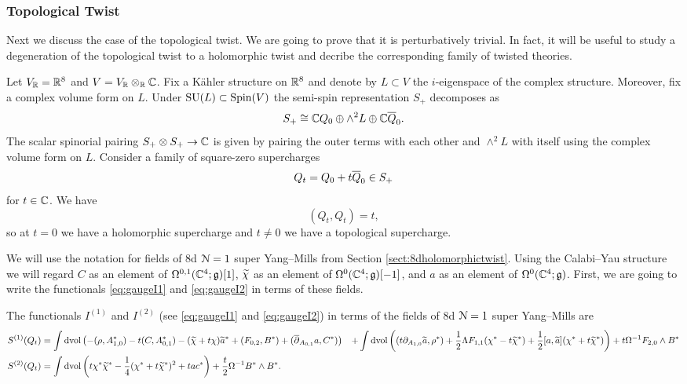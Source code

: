 \documentclass[10pt, oneside]{article}
\begin{document}
\subsubsection{Topological Twist}
\label{sect:8dtopologicaltwist}

Next we discuss the case of the topological twist. We are going to prove that it is perturbatively trivial. In fact, it will be useful to study a degeneration of the topological twist to a holomorphic twist and decribe the corresponding family of twisted theories.

Let $V_\mathbb R = \mathbb R^8$ and $V=V_\mathbb R\otimes_\mathbb R\mathbb C$. Fix a K\"ahler structure on $\mathbb R^8$ and denote by $L\subset V$ the $i$-eigenspace of the complex structure. Moreover, fix a complex volume form on $L$. Under $\mathrm{SU}(L)\subset \mathrm{Spin}(V)$ the semi-spin representation $S_+$ decomposes as
\[S_+\cong \mathbb C Q_0\oplus \wedge^2 L\oplus \mathbb C \overline{Q}_0.\]
The scalar spinorial pairing $S_+\otimes S_+\rightarrow \mathbb C$ is given by pairing the outer terms with each other and $\wedge^2L$ with itself using the complex volume form on $L$. Consider a family of square-zero supercharges
\begin{equation}
Q_t = Q_0 + t\Bar{Q}_0\in S_+
\label{eq:8dHodgefamily}
\end{equation}
for $t\in\mathbb C$. We have
\[(Q_t, Q_t) = t,\]
so at $t=0$ we have a holomorphic supercharge and $t\neq 0$ we have a topological supercharge.

We will use the notation for fields of 8d $\mathcal N=1$ super Yang--Mills from Section \ref{sect:8dholomorphictwist}. Using the Calabi--Yau structure we will regard $C$ as an element of $\Omega^{0, 1}(\mathbb C^4;\mathfrak g)[1]$, $\widetilde{\chi}$ as an element of $\Omega^0(\mathbb C^4;\mathfrak g)[-1]$, and $a$ as an element of $\Omega^0(\mathbb C^4 ; \mathfrak g)$. First, we are going to write the functionals \eqref{eq:gaugeI1} and \eqref{eq:gaugeI2} in terms of these fields.

\begin{prop}
The functionals $I^{(1)}$ and $I^{(2)}$ (see \eqref{eq:gaugeI1} and \eqref{eq:gaugeI2}) in terms of the fields of 8d $\mathcal N=1$ super Yang--Mills are
\begin{align*}
S^{(1)}(Q_t) &= \int \operatorname{dvol}\left(-(\rho, A_{1, 0}^*) - t(C, A_{0, 1}^*) - (\widetilde{\chi} + t\chi)\widetilde{a}^* + (F_{0, 2}, B^*)  + (\overline{\partial}_{A_{0, 1}} a, C^*)\right) 
&+ \int\operatorname{dvol}\left((t\partial_{A_{1, 0}} \widetilde{a}, \rho^*) + \frac{1}{2}\Lambda F_{1, 1}(\chi^* - t\widetilde{\chi}^*) + \frac{1}{2}[a, \widetilde{a}](\chi^*+t\widetilde{\chi}^*)\right) + t\Omega^{-1} F_{2, 0}\wedge B^* \\
S^{(2)}(Q_t) &= \int \operatorname{dvol} \left(t\chi^*\widetilde{\chi}^* -\frac{1}{4}(\chi^* + t\widetilde{\chi}^*)^2 + tac^*\right) + \frac{t}{2}\Omega^{-1}B^*\wedge B^* .
\end{align*}
\end{prop}
\end{document}
